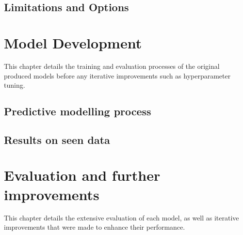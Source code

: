 \documentclass[12pt]{report}
\begin{document}



\section{Limitations and Options}


\chapter{Model Development} %
This chapter details the training and evaluation processes of the original produced models
before any iterative improvements such as hyperparameter tuning.

\section{Predictive modelling process}

\section{Results on seen data}

\chapter{Evaluation and further improvements}
This chapter details the extensive evaluation of each model, as well as iterative improvements 
that were made to enhance their performance.
\end{document}
